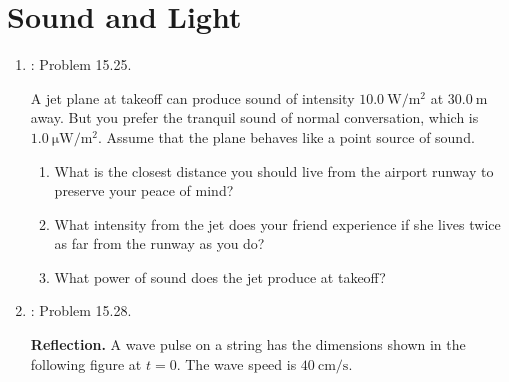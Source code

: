\documentclass[../psets.tex]{subfiles}
\begin{document}
\section{Sound and Light}
\begin{enumerate}[label={\arabic*)}]
    \item {}\textcite{bib:YoungFreedman}: Problem 15.25.\par
    A jet plane at takeoff can produce sound of intensity $\SI{10.0}{\watt\per\square\meter}$ at $\SI{30.0}{\meter}$ away. But you prefer the tranquil sound of normal conversation, which is $\SI{1.0}{\micro\watt\per\square\meter}$. Assume that the plane behaves like a point source of sound.
    \begin{enumerate}
        \item What is the closest distance you should live from the airport runway to preserve your peace of mind?
        \item What intensity from the jet does your friend experience if she lives twice as far from the runway as you do?
        \item What power of sound does the jet produce at takeoff?
    \end{enumerate}
    \item \textcite{bib:YoungFreedman}: Problem 15.28.\par
    \textbf{Reflection.} A wave pulse on a string has the dimensions shown in the following figure at $t=0$. The wave speed is $\SI{40}{\centi\meter\per\second}$.
    \begin{center}
\end{center}
\end{enumerate}
\end{document}
